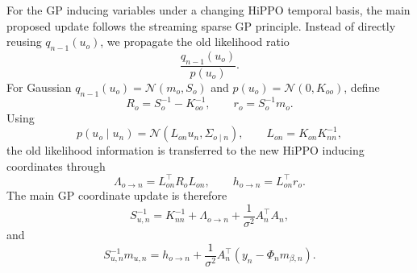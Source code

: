 \documentclass[12pt]{article}
\begin{document}
For the GP inducing variables under a changing HiPPO temporal basis, the main proposed
update follows the streaming sparse GP principle. Instead of directly reusing
\(q_{n-1}(u_o)\), we propagate the old likelihood ratio
\begin{equation}
    \frac{q_{n-1}(u_o)}{p(u_o)}.
\end{equation}
For Gaussian \(q_{n-1}(u_o)=\mathcal{N}(m_o,S_o)\) and
\(p(u_o)=\mathcal{N}(0,K_{oo})\), define
\begin{equation}
    R_o=S_o^{-1}-K_{oo}^{-1},
    \qquad
    r_o=S_o^{-1}m_o.
\end{equation}
Using
\begin{equation}
    p(u_o\mid u_n)
    =
    \mathcal{N}
    \left(
        L_{on}u_n,
        \Sigma_{o\mid n}
    \right),
    \qquad
    L_{on}=K_{on}K_{nn}^{-1},
\end{equation}
the old likelihood information is transferred to the new HiPPO inducing coordinates
through
\begin{equation}
    \Lambda_{o\rightarrow n}
    =
    L_{on}^\top R_oL_{on},
    \qquad
    h_{o\rightarrow n}
    =
    L_{on}^\top r_o.
\end{equation}
The main GP coordinate update is therefore
\begin{equation}
    S_{u,n}^{-1}
    =
    K_{nn}^{-1}
    +
    \Lambda_{o\rightarrow n}
    +
    \frac{1}{\sigma^2}A_n^\top A_n,
\end{equation}
and
\begin{equation}
    S_{u,n}^{-1}m_{u,n}
    =
    h_{o\rightarrow n}
    +
    \frac{1}{\sigma^2}
    A_n^\top
    \left(
        y_n-\Phi_nm_{\beta,n}
    \right).
\end{equation}
\end{document}
